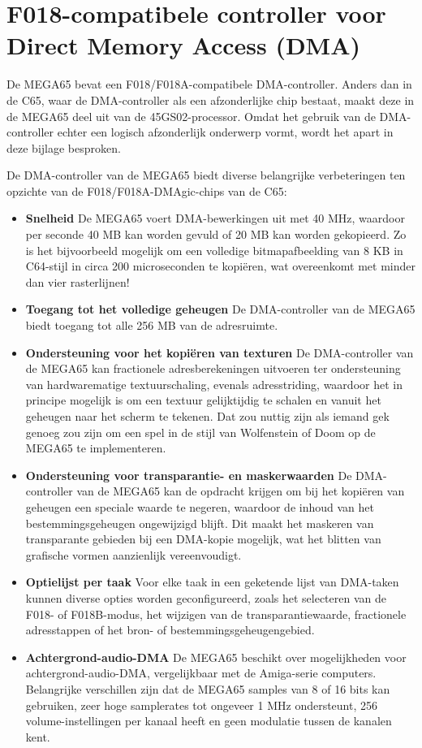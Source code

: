 \chapter{F018-compatibele controller voor Direct Memory Access (DMA)}
\label{cha:dmagic}

De MEGA65 bevat een F018/F018A-compatibele DMA-controller. Anders dan in de C65, waar de DMA-controller als een afzonderlijke chip bestaat, maakt deze in de MEGA65 deel uit van de 45GS02-processor. Omdat het gebruik van de DMA-controller echter een logisch afzonderlijk onderwerp vormt, wordt het apart in deze bijlage besproken.

De DMA-controller van de MEGA65 biedt diverse belangrijke verbeteringen ten opzichte van de F018/F018A-DMAgic-chips van de C65:

\begin{itemize}
\item{\bf Snelheid} De MEGA65 voert DMA-bewerkingen uit met 40 MHz, waardoor per seconde 40 MB kan worden gevuld of 20 MB kan worden gekopieerd. Zo is het bijvoorbeeld mogelijk om een volledige bitmapafbeelding van 8 KB in C64-stijl in circa 200 microseconden te kopiëren, wat overeenkomt met minder dan vier rasterlijnen! \item{\bf Toegang tot het volledige geheugen} De DMA-controller van de MEGA65 biedt toegang tot alle 256 MB van de adresruimte. \item{\bf Ondersteuning voor het kopiëren van texturen} De DMA-controller van de MEGA65 kan fractionele adresberekeningen uitvoeren ter ondersteuning van hardwarematige textuurschaling, evenals adresstriding, waardoor het in principe mogelijk is om een textuur gelijktijdig te schalen en vanuit het geheugen naar het scherm te tekenen. Dat zou nuttig zijn als iemand gek genoeg zou zijn om een spel in de stijl van Wolfenstein of Doom op de MEGA65 te implementeren. \item{\bf Ondersteuning voor transparantie- en maskerwaarden} De DMA-controller van de MEGA65 kan de opdracht krijgen om bij het kopiëren van geheugen een speciale waarde te negeren, waardoor de inhoud van het bestemmingsgeheugen ongewijzigd blijft. Dit maakt het maskeren van transparante gebieden bij een DMA-kopie mogelijk, wat het blitten van grafische vormen aanzienlijk vereenvoudigt. \item{\bf Optielijst per taak} Voor elke taak in een geketende lijst van DMA-taken kunnen diverse opties worden geconfigureerd, zoals het selecteren van de F018- of F018B-modus, het wijzigen van de transparantiewaarde, fractionele adresstappen of het bron- of bestemmingsgeheugengebied.

\item{\bf Achtergrond-audio-DMA}  De MEGA65 beschikt over mogelijkheden voor achtergrond-audio-DMA, vergelijkbaar met de Amiga\texttrademark{}-serie computers. Belangrijke verschillen zijn dat de MEGA65 samples van 8 of 16 bits kan gebruiken, zeer hoge samplerates tot ongeveer 1 MHz ondersteunt, 256 volume-instellingen per kanaal heeft en geen modulatie tussen de kanalen kent.

\end{itemize}


